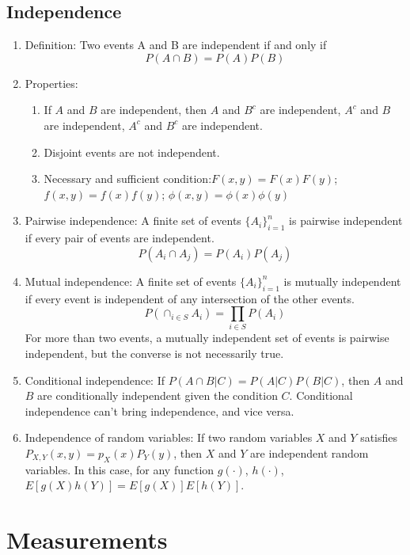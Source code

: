 \documentclass[a4paper]{article}
\begin{document}
\subsection{Independence}
	\begin{enumerate}
	\item Definition: Two events A and B are independent if and only if 
$$P(A\cap B)=P(A)P(B)$$
	\item Properties:
		\begin{enumerate}
		\item If $A$ and $B$ are independent, then $A$ and $B^c$ are independent, $A^c$ and $B$ are independent, $A^c$ and $B^c$ are independent.
		\item Disjoint events are not independent.
		\item Necessary and sufficient condition:$F(x,y)=F(x)F(y)$; $f(x,y)=f(x)f(y)$; $\phi(x,y)=\phi(x)\phi(y)$
		\end{enumerate}
	\item Pairwise independence: A finite set of events $\{A_i\}_{i=1}^n$ is pairwise independent if every pair of events are independent.
$$P(A_i\cap A_j)=P(A_i)P(A_j)$$
	\item Mutual independence: A finite set of events $\{A_i\}_{i=1}^n$ is mutually independent if every event is independent of any intersection of the other events.
$$P(\cap_{i\in S}A_i)=\prod_{i\in S}P(A_i)$$
		For more than two events, a mutually independent set of events is pairwise independent, but the converse is not necessarily true. 
	\item Conditional independence: If $P(A\cap B|C)=P(A|C)P(B|C)$, then $A$ and $B$ are conditionally independent given the condition $C$. Conditional independence can't bring independence, and vice versa.
	\item Independence of random variables: If two random variables $X$ and $Y$ satisfies $P_{X,Y}(x,y)=p_X(x)P_Y(y)$, then $X$ and $Y$ are independent random variables. In this case, for any function $g(\cdot)$, $h(\cdot)$, $E[g(X)h(Y)]=E[g(X)]E[h(Y)]$.
	\end{enumerate}


\section{Measurements}
\end{document}

